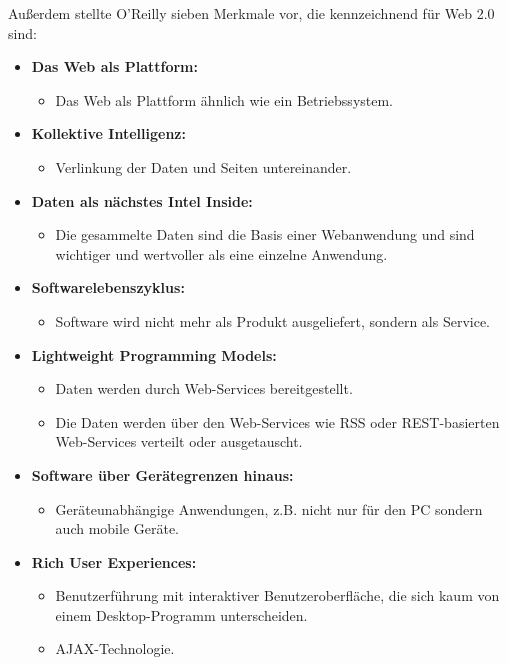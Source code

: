 \newpage
Außerdem stellte O’Reilly sieben Merkmale vor, die kennzeichnend für Web 2.0 sind:

\begin{itemize}
\item \textbf{Das Web als Plattform:}
\begin{itemize}
\item Das Web als Plattform ähnlich wie ein Betriebssystem.
\end{itemize}
\item \textbf{Kollektive Intelligenz:}
\begin{itemize}
\item Verlinkung der Daten und Seiten untereinander.
\end{itemize}
\item \textbf{Daten als nächstes Intel Inside:}
\begin{itemize}
\item Die gesammelte Daten sind die Basis einer Webanwendung und sind wichtiger und wertvoller als eine einzelne Anwendung.
\end{itemize}
\item \textbf{Softwarelebenszyklus:}
\begin{itemize}
\item Software wird nicht mehr als Produkt ausgeliefert, sondern als Service.
\end{itemize}
\item \textbf{Lightweight Programming Models:}
\begin{itemize}
\item Daten werden durch Web-Services bereitgestellt.
\end{itemize}
\begin{itemize}
\item Die Daten werden über den Web-Services wie RSS oder REST-basierten Web-Services verteilt oder ausgetauscht.
\end{itemize}
\item \textbf{Software über Gerätegrenzen hinaus:}
\begin{itemize}
\item Geräteunabhängige Anwendungen, z.B. nicht nur für den PC sondern auch mobile Geräte.
\end{itemize}
\item \textbf{Rich User Experiences:}
\begin{itemize}
\item Benutzerführung mit interaktiver Benutzeroberfläche, die sich kaum von einem Desktop-Programm unterscheiden.
\end{itemize}
\begin{itemize}
\item AJAX-Technologie.
\end{itemize}
\end{itemize}

